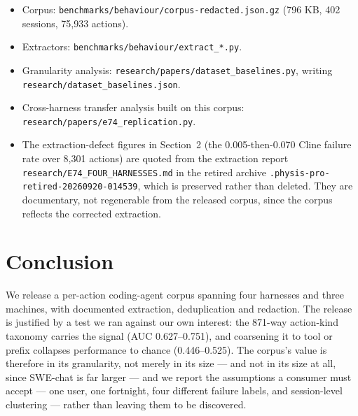 \documentclass[11pt]{article}
\begin{document}
\begin{itemize}
\item Corpus: \texttt{benchmarks/behaviour/corpus-redacted.json.gz}
  (796 KB, 402 sessions, 75,933 actions).
\item Extractors: \texttt{benchmarks/behaviour/extract\_*.py}.
\item Granularity analysis: \texttt{research/papers/dataset\_baselines.py},
  writing \texttt{research/dataset\_baselines.json}.
\item Cross-harness transfer analysis built on this corpus:
  \texttt{research/papers/e74\_replication.py}.
\item The extraction-defect figures in Section~2 (the 0.005-then-0.070
  Cline failure rate over 8,301 actions) are quoted from the extraction
  report \texttt{research/E74\_FOUR\_HARNESSES.md} in the retired archive
  \texttt{.physis-pro-retired-20260920-014539}, which is preserved rather
  than deleted. They are documentary, not regenerable from the released
  corpus, since the corpus reflects the corrected extraction.
\end{itemize}

\section{Conclusion}

We release a per-action coding-agent corpus spanning four harnesses and
three machines, with documented extraction, deduplication and redaction.
The release is justified by a test we ran against our own interest: the
871-way action-kind taxonomy carries the signal (AUC 0.627--0.751), and
coarsening it to tool or prefix collapses performance to chance
(0.446--0.525). The corpus's value is therefore in its granularity, not
merely in its size --- and not in its size at all, since SWE-chat is far
larger --- and we report the assumptions a consumer must accept
--- one user, one fortnight, four different failure labels, and
session-level clustering --- rather than leaving them to be discovered.
\end{document}
